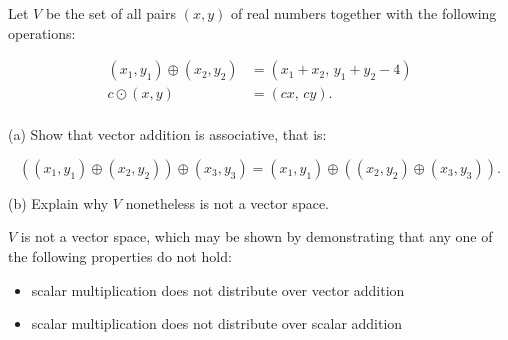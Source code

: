 
\begin{exerciseStatement}


 Let \(V\) be the set of all pairs \((x,y)\) of real numbers together with the following operations: 


\begin{align*} (x_1,y_1)\oplus (x_2,y_2)&= \left(x_{1} + x_{2},\,y_{1} + y_{2} - 4\right)  \\c \odot (x,y) &= \left(c x,\,c y\right) . \\ \end{align*}
            

 (a) Show that vector addition is associative, that is: 

\[\left((x_1,y_1)\oplus(x_2,y_2)\right)\oplus(x_3,y_3)=(x_1,y_1)\oplus\left((x_2,y_2)\oplus(x_3,y_3)\right).
    \]

 (b) Explain why \(V\) nonetheless is not a vector space. 


\end{exerciseStatement}
    
\begin{exerciseAnswer} 


\(V\) is not a vector space, which may be shown by demonstrating that any one of the following properties do not hold: 


\begin{itemize}
\item scalar multiplication does not distribute over vector addition
\item scalar multiplication does not distribute over scalar addition
\end{itemize}
    
\end{exerciseAnswer}
    
